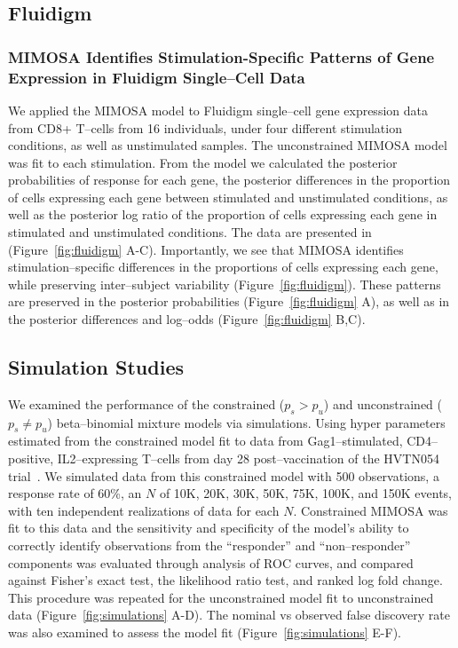 \documentclass[11pt]{article}
\begin{document}
\subsection{Fluidigm}
\subsubsection{MIMOSA Identifies Stimulation-Specific Patterns of Gene Expression in Fluidigm Single--Cell Data}
We applied the MIMOSA model to Fluidigm single--cell gene expression data from CD8+ T--cells from 16 individuals, under four different stimulation conditions, as well as unstimulated samples. The unconstrained MIMOSA model was fit to each stimulation. From the model we calculated the posterior probabilities of response for each gene, the posterior differences in the proportion of cells expressing each gene between stimulated and unstimulated conditions, as well as the posterior log ratio of the proportion of cells expressing each gene in stimulated and unstimulated conditions. The data are presented in (Figure~\ref{fig:fluidigm} A-C). Importantly, we see that MIMOSA identifies stimulation--specific differences in the proportions of cells expressing each gene, while preserving inter--subject variability (Figure~\ref{fig:fluidigm}). These patterns are preserved in the  posterior probabilities (Figure~\ref{fig:fluidigm} A), as well as in the posterior differences and log--odds (Figure~\ref{fig:fluidigm} B,C). 
 
\subsection{Simulation Studies}
We examined the performance of the constrained ($p_s>p_u$) and unconstrained ($p_s \ne p_u$) beta--binomial mixture models via simulations. Using hyper parameters estimated from the constrained model fit to data from Gag1--stimulated, CD4--positive, IL2--expressing T--cells from day 28 post--vaccination of the HVTN054 trial~\cite{Peiperl:2010ej}. We simulated data from this constrained model with 500 observations, a response rate of 60\%, an $N$ of 10K, 20K, 30K, 50K, 75K, 100K, and 150K events, with ten independent realizations of data for each $N$. Constrained MIMOSA was fit to this data and the sensitivity and specificity of the model's ability to correctly identify observations from the ``responder'' and ``non--responder'' components was evaluated through analysis of ROC curves, and compared against Fisher's exact test, the likelihood ratio test, and ranked log fold change. This procedure was repeated for the unconstrained model fit to unconstrained data (Figure~\ref{fig:simulations} A-D). The nominal vs observed false discovery rate was also examined to assess the model fit (Figure~\ref{fig:simulations} E-F). 
\end{document}
